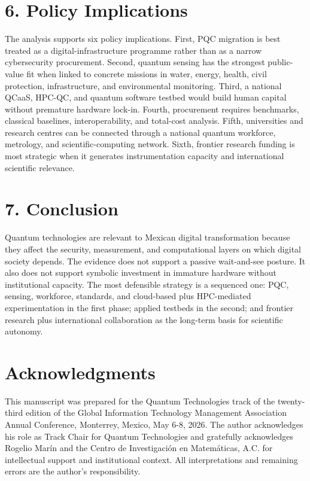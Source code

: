 \documentclass[
  11pt,
  letterpaper,
]{article}
\begin{document}
\section{6. Policy Implications}\label{policy-implications}

The analysis supports six policy implications. First, PQC migration is
best treated as a digital-infrastructure programme rather than as a
narrow cybersecurity procurement. Second, quantum sensing has the
strongest public-value fit when linked to concrete missions in water,
energy, health, civil protection, infrastructure, and environmental
monitoring. Third, a national QCaaS, HPC-QC, and quantum software
testbed would build human capital without premature hardware lock-in.
Fourth, procurement requires benchmarks, classical baselines,
interoperability, and total-cost analysis. Fifth, universities and
research centres can be connected through a national quantum workforce,
metrology, and scientific-computing network. Sixth, frontier research
funding is most strategic when it generates instrumentation capacity and
international scientific relevance.

\section{7. Conclusion}\label{conclusion}

Quantum technologies are relevant to Mexican digital transformation
because they affect the security, measurement, and computational layers
on which digital society depends. The evidence does not support a
passive wait-and-see posture. It also does not support symbolic
investment in immature hardware without institutional capacity. The most
defensible strategy is a sequenced one: PQC, sensing, workforce,
standards, and cloud-based plus HPC-mediated experimentation in the
first phase; applied testbeds in the second; and frontier research plus
international collaboration as the long-term basis for scientific
autonomy.

\section{Acknowledgments}\label{acknowledgments}

This manuscript was prepared for the Quantum Technologies track of the
twenty-third edition of the Global Information Technology Management
Association Annual Conference, Monterrey, Mexico, May 6-8, 2026. The
author acknowledges his role as Track Chair for Quantum Technologies and
gratefully acknowledges Rogelio Marín and the Centro de Investigación en
Matemáticas, A.C. for intellectual support and institutional context.
All interpretations and remaining errors are the author's
responsibility.
\end{document}
